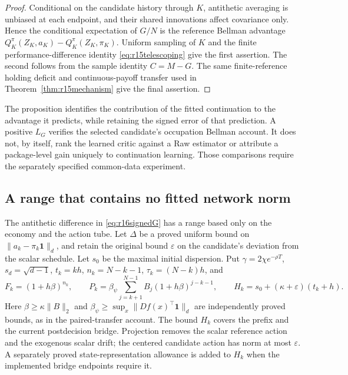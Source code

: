 \begin{proof}
Conditional on the candidate history through $K$, antithetic averaging is
unbiased at each endpoint, and their shared innovations affect covariance
only. Hence the conditional expectation of $G/N$ is the reference Bellman
advantage $Q_K^\pi(Z_K,a_K)-Q_K^\pi(Z_K,\pi_K)$. Uniform sampling of $K$
and the finite performance-difference identity \eqref{eq:r15telescoping}
give the first assertion. The second follows from the sample identity
$C=M-G$. The same finite-reference holding deficit and continuous-payoff
transfer used in Theorem~\ref{thm:r15mechanism} give the final assertion.
\end{proof}

The proposition identifies the contribution of the fitted continuation to
the advantage it predicts, while retaining the signed error of that prediction.
A positive $L_G$ verifies the selected candidate's occupation Bellman account.
It does not, by itself, rank the learned critic against a Raw estimator or
attribute a package-level gain uniquely to continuation learning. Those
comparisons require the separately specified common-data experiment.

\subsection{A range that contains no fitted network norm}
\label{app:r16signedrange}

The antithetic difference in \eqref{eq:r16signedG} has a range based only on
the economy and the action tube. Let $\Delta$ be a proved uniform bound on
$\|a_k-\pi_k\bm1\|_d$, and retain the original bound $\varepsilon$ on the
candidate's deviation from the scalar schedule. Let $s_0$ be the maximal
initial dispersion. Put $\gamma=2\chi e^{-\rho T}$, $s_d=\sqrt{d-1}$,
$t_k=kh$, $n_k=N-k-1$, $\tau_k=(N-k)h$, and
\[
 F_k=(1+h\beta)^{n_k},\qquad
 P_k=\beta_\psi\sum_{j=k+1}^{N-1} B_j(1+h\beta)^{j-k-1},
\qquad H_k=s_0+(\kappa+\varepsilon)(t_k+h).
\]
Here $\beta\geq\kappa\|B\|_2$ and
$\beta_\psi\geq\sup_x\|Df(x)^\top\bm1\|_d$ are independently
proved bounds, as in the paired-transfer account. The bound $H_k$ covers
the prefix and the current postdecision bridge. Projection removes the
scalar reference action and the exogenous scalar drift; the centered
candidate action has norm at most $\varepsilon$. A separately proved
state-representation allowance is added to $H_k$ when the implemented
bridge endpoints require it.

